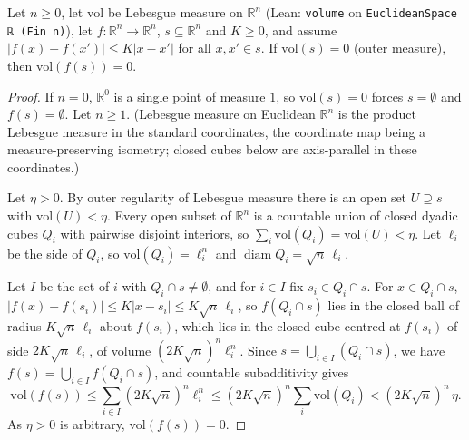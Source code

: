 \begin{lemma}
Let $n\ge0$, let $\mathrm{vol}$ be Lebesgue measure on $\mathbb R^n$ (Lean: \texttt{volume} on \texttt{EuclideanSpace ℝ (Fin n)}), let $f:\mathbb R^n\to\mathbb R^n$, $s\subseteq\mathbb R^n$ and $K\ge0$, and assume $|f(x)-f(x')|\le K|x-x'|$ for all $x,x'\in s$. If $\mathrm{vol}(s)=0$ (outer measure), then $\mathrm{vol}(f(s))=0$.
\end{lemma}
\begin{proof}
If $n=0$, $\mathbb R^0$ is a single point of measure $1$, so $\mathrm{vol}(s)=0$ forces $s=\emptyset$ and $f(s)=\emptyset$. Let $n\ge1$. (Lebesgue measure on Euclidean $\mathbb R^n$ is the product Lebesgue measure in the standard coordinates, the coordinate map being a measure-preserving isometry; closed cubes below are axis-parallel in these coordinates.)

Let $\eta>0$. By outer regularity of Lebesgue measure there is an open set $U\supseteq s$ with $\mathrm{vol}(U)<\eta$. Every open subset of $\mathbb R^n$ is a countable union of closed dyadic cubes $Q_i$ with pairwise disjoint interiors, so $\sum_i\mathrm{vol}(Q_i)=\mathrm{vol}(U)<\eta$. Let $\ell_i$ be the side of $Q_i$, so $\mathrm{vol}(Q_i)=\ell_i^n$ and $\operatorname{diam}Q_i=\sqrt n\,\ell_i$.

Let $I$ be the set of $i$ with $Q_i\cap s\ne\emptyset$, and for $i\in I$ fix $s_i\in Q_i\cap s$. For $x\in Q_i\cap s$, $|f(x)-f(s_i)|\le K|x-s_i|\le K\sqrt n\,\ell_i$, so $f(Q_i\cap s)$ lies in the closed ball of radius $K\sqrt n\,\ell_i$ about $f(s_i)$, which lies in the closed cube centred at $f(s_i)$ of side $2K\sqrt n\,\ell_i$, of volume $(2K\sqrt n)^n\ell_i^n$. Since $s=\bigcup_{i\in I}(Q_i\cap s)$, we have $f(s)=\bigcup_{i\in I}f(Q_i\cap s)$, and countable subadditivity gives
\[
\mathrm{vol}(f(s))\le\sum_{i\in I}(2K\sqrt n)^n\ell_i^n\le(2K\sqrt n)^n\sum_i\mathrm{vol}(Q_i)<(2K\sqrt n)^n\,\eta .
\]
As $\eta>0$ is arbitrary, $\mathrm{vol}(f(s))=0$.
\end{proof}
